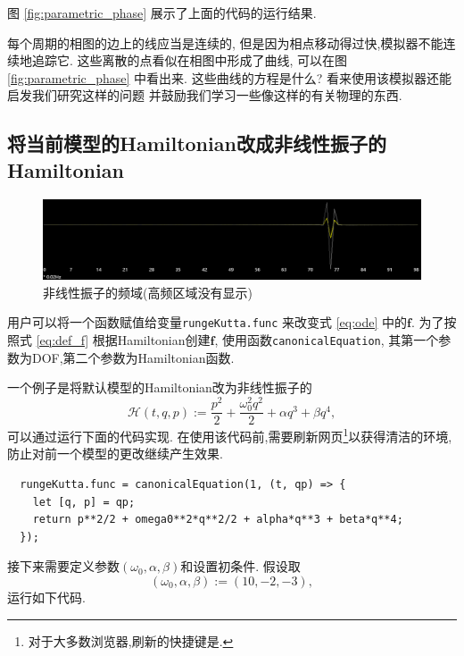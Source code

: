 \documentclass[12pt]{article}
\begin{document}
图 \ref{fig:parametric_phase} 展示了上面的代码的运行结果.

每个周期的相图的边上的线应当是连续的,
但是因为相点移动得过快,模拟器不能连续地追踪它.
这些离散的点看似在相图中形成了曲线,
可以在图 \ref{fig:parametric_phase} 中看出来.
这些曲线的方程是什么?
看来使用该模拟器还能启发我们研究这样的问题
并鼓励我们学习一些像这样的有关物理的东西.

\subsection{将当前模型的Hamiltonian改成非线性振子的Hamiltonian}

\begin{figure}
  \centering
  \includegraphics[width=0.9\linewidth]{nonlinear_frequency.png}
  \caption{非线性振子的频域(高频区域没有显示)}
  \label{fig:nonlinear}
\end{figure}

用户可以将一个函数赋值给变量\texttt{rungeKutta.func}
来改变式 \ref{eq:ode} 中的$\mathbf f$.
为了按照式 \ref{eq:def_f} 根据Hamiltonian创建$\mathbf f$,
使用函数\texttt{canonicalEquation},
其第一个参数为DOF,第二个参数为Hamiltonian函数.

一个例子是将默认模型的Hamiltonian改为非线性振子的
\begin{equation*}
  \mathcal H\left(t,q,p\right):=\frac{p^2}2+\frac{\omega_0^2q^2}2+\alpha q^3+\beta q^4,
\end{equation*}
可以通过运行下面的代码实现.
在使用该代码前,需要刷新网页\footnote{
  对于大多数浏览器,刷新的快捷键是.
}以获得清洁的环境,防止对前一个模型的更改继续产生效果.

\begin{verbatim}
  rungeKutta.func = canonicalEquation(1, (t, qp) => {
    let [q, p] = qp;
    return p**2/2 + omega0**2*q**2/2 + alpha*q**3 + beta*q**4;
  });
\end{verbatim}

接下来需要定义参数$\left(\omega_0,\alpha,\beta\right)$和设置初条件.
假设取
\begin{equation*}
  \left(\omega_0,\alpha,\beta\right):=\left(10,-2,-3\right),
\end{equation*}
运行如下代码.
\end{document}
